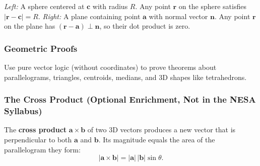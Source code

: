 \documentclass[12pt]{article}
\begin{document}
\begin{center}
\end{center}

\vspace{0.5em}
\noindent\textit{Left:} A sphere centered at $\mathbf{c}$ with radius $R$. Any point $\mathbf{r}$ on the sphere satisfies $|\mathbf{r}-\mathbf{c}|=R$.
\textit{Right:} A plane containing point $\mathbf{a}$ with normal vector $\mathbf{n}$. Any point $\mathbf{r}$ on the plane has $(\mathbf{r}-\mathbf{a})\perp\mathbf{n}$, so their dot product is zero.

\subsubsection{Geometric Proofs}
Use pure vector logic (without coordinates) to prove theorems about parallelograms, triangles, centroids, medians, and 3D shapes like tetrahedrons.

\subsubsection{The Cross Product (Optional Enrichment, Not in the NESA Syllabus)}
\label{sec:cross-product-brief}

The \textbf{cross product} $\mathbf{a} \times \mathbf{b}$ of two 3D vectors produces a new vector that is perpendicular to both $\mathbf{a}$ and $\mathbf{b}$. Its magnitude equals the area of the parallelogram they form:
\[
  |\mathbf{a} \times \mathbf{b}| = |\mathbf{a}|\,|\mathbf{b}|\sin\theta.
\]
\end{document}
